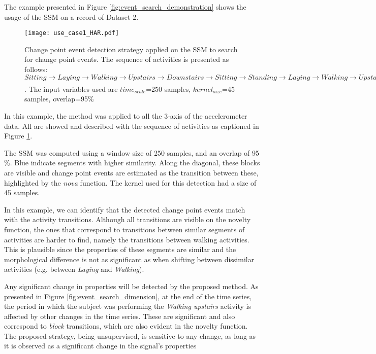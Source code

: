 The example presented in Figure \ref{fig:event_search_demonstration} shows the usage of the \gls{SSM} on a record of Dataset 2. 

\begin{figure}
    \centering
    \texttt{[image: use\_case1\_HAR.pdf]}
    \caption{Change point event detection strategy applied on the SSM to search for change point events. The sequence of activities is presented as follows: $Sitting \xrightarrow[]{} Laying \xrightarrow[]{} Walking \xrightarrow[]{} Upstairs \xrightarrow[]{} Downstairs \xrightarrow[]{} Sitting \xrightarrow[]{} Standing \xrightarrow[]{} Laying \xrightarrow[]{} Walking \xrightarrow[]{} Upstairs$. The input variables used are $time_{scale}$=250 samples, $kernel_{size}$=45 samples, overlap=95\%}
    \label{fig:use_case1}
\end{figure}

In this example, the method was applied to all the 3-axis of the accelerometer data. All are showed and described with the sequence of activities as captioned in Figure \ref{fig:use_case1}.
\par
The \gls{SSM} was computed using a window size of 250 samples, and an overlap of 95 \%. Blue indicate segments with higher similarity. Along the diagonal, these blocks are visible and change point events are estimated as the transition between these, highlighted by the \textit{nova} function. The kernel used for this detection had a size of 45 samples.
\par
In this example, we can identify that the detected change point events match with the activity transitions. Although all transitions are visible on the novelty function, the ones that correspond to transitions between similar segments of activities are harder to find, namely the transitions between walking activities. This is plausible since the properties of these segments are similar and the morphological difference is not as significant as when shifting between dissimilar activities (e.g. between \textit{Laying} and \textit{Walking}).
\par
Any significant change in properties will be detected by the proposed method. As presented in Figure \ref{fig:event_search_dimension}, at the end of the time series, the period in which the subject was performing the \textit{Walking upstairs} activity is affected by other changes in the time series. These are significant and also correspond to \textit{block} transitions, which are also evident in the novelty function. The proposed strategy, being unsupervised, is sensitive to any change, as long as it is observed as a significant change in the signal's properties\\


